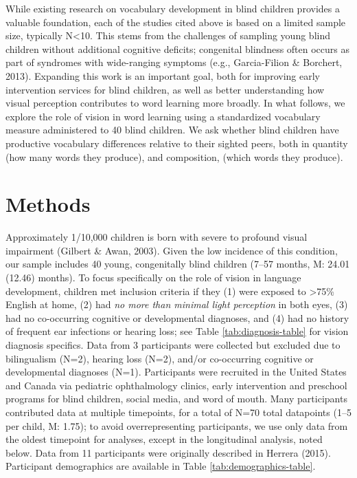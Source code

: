 \documentclass[
  man,floatsintext]{apa6}
\begin{document}
While existing research on vocabulary development in blind children provides a valuable foundation, each of the studies cited above is based on a limited sample size, typically N\textless10. This stems from the challenges of sampling young blind children without additional cognitive deficits; congenital blindness often occurs as part of syndromes with wide-ranging symptoms (e.g., Garcia-Filion \& Borchert, 2013). Expanding this work is an important goal, both for improving early intervention services for blind children, as well as better understanding how visual perception contributes to word learning more broadly. In what follows, we explore the role of vision in word learning using a standardized vocabulary measure administered to 40 blind children. We ask whether blind children have productive vocabulary differences relative to their sighted peers, both in quantity (how many words they produce), and composition, (which words they produce).

\hypertarget{methods}{%
\section{Methods}\label{methods}}

Approximately 1/10,000 children is born with severe to profound visual impairment (Gilbert \& Awan, 2003). Given the low incidence of this condition, our sample includes 40 young, congenitally blind children (7--57 months, M: 24.01 (12.46) months). To focus specifically on the role of vision in language development, children met inclusion criteria if they (1) were exposed to \textgreater75\% English at home, (2) had \emph{no more than minimal light perception} in both eyes, (3) had no co-occurring cognitive or developmental diagnoses, and (4) had no history of frequent ear infections or hearing loss; see Table \ref{tab:diagnosis-table} for vision diagnosis specifics. Data from 3 participants were collected but excluded due to bilingualism (N=2), hearing loss (N=2), and/or co-occurring cognitive or developmental diagnoses (N=1). Participants were recruited in the United States and Canada via pediatric ophthalmology clinics, early intervention and preschool programs for blind children, social media, and word of mouth. Many participants contributed data at multiple timepoints, for a total of N=70 total datapoints (1--5 per child, M: 1.75); to avoid overrepresenting participants, we use only data from the oldest timepoint for analyses, except in the longitudinal analysis, noted below. Data from 11 participants were originally described in Herrera (2015). Participant demographics are available in Table \ref{tab:demographics-table}.
\end{document}
